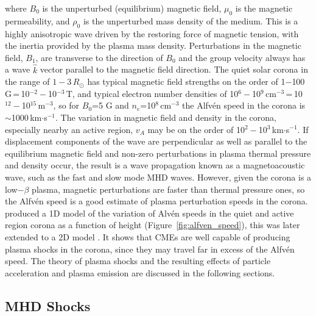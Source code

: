 where $B_{0}$ is the unperturbed (equilibrium) magnetic field, $\mu_{0}$ is the magnetic permeability, and $\rho_{0}$ is the unperturbed mass density of the medium. This is a highly anisotropic wave driven by the restoring force of magnetic tension, with the inertia provided by the plasma mass density. Perturbations in the magnetic field, $B_{1}$, are transverse to the direction of $B_0$ and the group velocity always has a wave $\hat{k}$ vector parallel to the magnetic field direction. The quiet solar corona in the range of $1-3$\,$R_{\odot}$ has typical magnetic field strengths on the order of 1$-$100\,G\,=\,10$^{-2}-$10$^{-3}$\,T, and typical electron number densities of 10$^{6} -$10$^{9}$\,cm$^{-3}$\,=\,10$^{12}-$10$^{15}$\,m$^{-3}$, so for $B_0$=5 G and $n_e$=10$^{8}$\,cm$^{-3}$ the Alfv\'{e}n speed in the corona is $\sim$1000\,km$\cdot$s$^{-1}$. The variation in magnetic field and density in the corona, especially nearby an active region, $v_{A}$ may be on the order of 10$^{2}-$10$^{3}$\,km$\cdot$s$^{-1}$. If displacement components of the wave are perpendicular as well as parallel to the equilibrium magnetic field and non-zero perturbations in plasma thermal pressure and density occur, the result is a wave propagation known as a magnetoacoustic wave, such as the fast and slow mode MHD waves. However, given the corona is a low$-\beta$ plasma, magnetic perturbations are faster than thermal pressure ones, so the Alfv\'{e}n speed is a good estimate of plasma perturbation speeds in the corona. \citet{mann2003} produced a 1D model of the variation of Alv\'{e}n speeds in the quiet and active region corona as a function of height (Figure~\ref{fig:alfven_speed}), this was later extended to a 2D model \citep{warmuth2005}. It shows that CMEs are well capable of producing plasma shocks in the corona, since they may travel far in excess of the Alfv\'{e}n speed. The theory of plasma shocks and the resulting effects of particle acceleration and plasma emission are discussed in the following sections.


\subsection{MHD Shocks}\label{sec:mhd_shocks}

